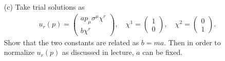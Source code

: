 \begin{enumerate}
    \bigskip\bigskip\hline\hline\bigskip
    \item[(c)] Take trial solutions as
    \begin{align*}
        u_r(p) =
        \begin{pmatrix}
        a p_\mu \sigma^\mu \chi^r \\
        b \chi^r
        \end{pmatrix}
        , \quad \chi^1 =
        \begin{pmatrix}
        1 \\
        0
        \end{pmatrix}
        , \quad \chi^2 =
        \begin{pmatrix}
        0 \\
        1
        \end{pmatrix}
        .
    \end{align*}
    Show that the two constants are related as $b = ma$. Then in order to normalize $u_r(p)$ as discussed in lecture, $a$ can be fixed.
    \bigskip\bigskip\hline\hline\bigskip

\end{enumerate}
